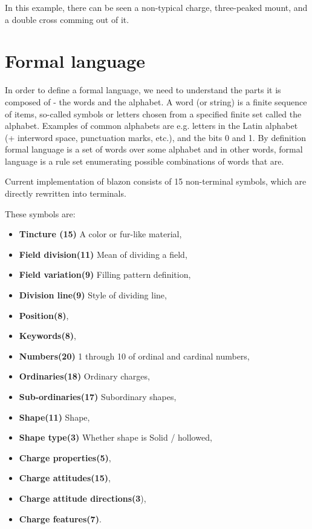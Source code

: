 \documentclass[12pt,a4paper]{article}
\let\oldsection\section
\renewcommand\section{\clearpage\oldsection}
\begin{document}
In this example, there can be seen a non-typical charge, three-peaked mount, and a double cross comming out of it.

\section{Formal language}
In order to define a formal language, we need to understand the parts it is composed of - the words and the alphabet.
A word (or string) is a finite sequence of items, so-called symbols or letters chosen from a specified finite set called the alphabet.
Examples of common alphabets are e.g. letters in the Latin alphabet (+ interword space, punctuation marks, etc.), and the bits 0 and 1.\cite{ruohonen2009formal}
By definition formal language is a set of words over some alphabet and in other words, formal language is a rule set enumerating possible combinations of words that are.

Current implementation of blazon consists of 15 non-terminal symbols, which are directly rewritten into terminals.

These symbols are:
\begin{itemize}
\setlength\itemsep{-0.5em}
\item \textbf{Tincture (15)} A color or fur-like material,
\item \textbf{Field division(11)} Mean of dividing a field,
\item \textbf{Field variation(9)} Filling pattern definition,
\item \textbf{Division line(9)} Style of dividing line,
\item \textbf{Position(8)},
\item \textbf{Keywords(8)},
\item \textbf{Numbers(20)} 1 through 10 of ordinal and cardinal numbers,
\item \textbf{Ordinaries(18)} Ordinary charges,
\item \textbf{Sub-ordinaries(17)} Subordinary shapes,
\item \textbf{Shape(11)} Shape,
\item \textbf{Shape type(3)} Whether shape is Solid / hollowed,
\item \textbf{Charge properties(5)},
\item \textbf{Charge attitudes(15)},
\item \textbf{Charge attitude directions(3}),
\item \textbf{Charge features(7)}.
\end{itemize}
\end{document}

